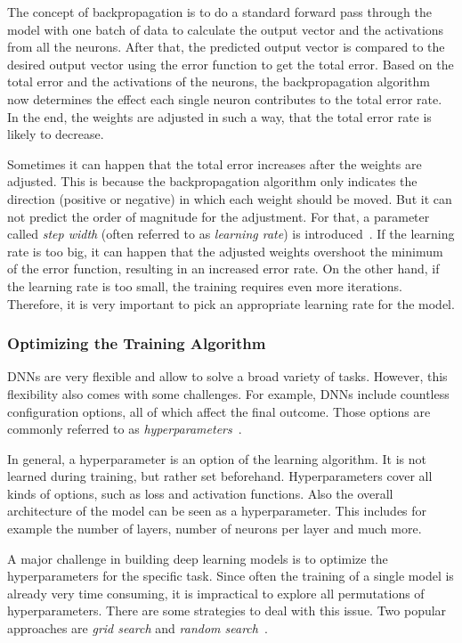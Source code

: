 The concept of backpropagation is to do a standard forward pass through the model with one batch of data to calculate the output vector and the activations from all the neurons. After that, the predicted output vector is compared to the desired output vector using the error function to get the total error. Based on the total error and the activations of the neurons, the backpropagation algorithm now determines the effect each single neuron contributes to the total error rate. In the end, the weights are adjusted in such a way, that the total error rate is likely to decrease.

Sometimes it can happen that the total error increases after the weights are adjusted. This is because the backpropagation algorithm only indicates the direction (positive or negative) in which each weight should be moved. But it can not predict the order of magnitude for the adjustment. For that, a parameter called \emph{step width} (often referred to as \emph{learning rate}) is introduced~\cite[p.~169]{nn_intro96}. If the learning rate is too big, it can happen that the adjusted weights overshoot the minimum of the error function, resulting in an increased error rate. On the other hand, if the learning rate is too small, the training requires even more iterations. Therefore, it is very important to pick an appropriate learning rate for the model.

\subsubsection{Optimizing the Training Algorithm}
DNNs are very flexible and allow to solve a broad variety of tasks. However, this flexibility also comes with some challenges. For example, DNNs include countless configuration options, all of which affect the final outcome. Those options are commonly referred to as \emph{hyperparameters}~\cite[pp.~270ff]{praxiseinstieg_ml17}. 

In general, a hyperparameter is an option of the learning algorithm. It is not learned during training, but rather set beforehand. Hyperparameters cover all kinds of options, such as loss and activation functions. Also the overall architecture of the model can be seen as a hyperparameter. This includes for example the number of layers, number of neurons per layer and much more.

A major challenge in building deep learning models is to optimize the hyperparameters for the specific task. Since often the training of a single model is already very time consuming, it is impractical to explore all permutations of hyperparameters. There are some strategies to deal with this issue. Two popular approaches are \emph{grid search} and \emph{random search}~\cite[pp.~73ff]{praxiseinstieg_ml17}.

